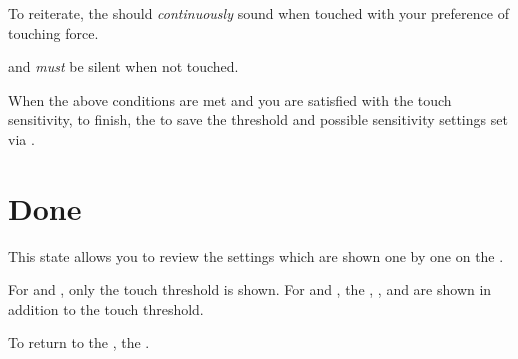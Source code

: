 
To reiterate, the  should \textit{continuously} sound when touched with
your preference of touching force.


and \textit{must} be silent when not touched.


When the above conditions are met and you are satisfied with the touch
sensitivity, to finish,  the  to save the threshold and possible
sensitivity settings set via \hyperref[Touch Configuration]{}.



\section{Done} 

This state allows you to review the settings which are shown one by one on
the .

\par\medskip

For  and , only the touch threshold is shown.  For 
and , the , ,  and  are shown in
addition to the touch threshold.

\par\medskip

To return to the ,  the .


